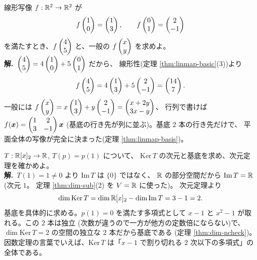 \begin{rei}[例題・基本(基底の行き先から写像を求める)]\label{rei:linmap-fromdata}
線形写像 $f : \mathbb{R}^2 \to \mathbb{R}^2$ が
\[
f\begin{pmatrix}1 \\ 0\end{pmatrix} = \begin{pmatrix}1 \\ 3\end{pmatrix}, \qquad f\begin{pmatrix}0 \\ 1\end{pmatrix} = \begin{pmatrix}2 \\ -1\end{pmatrix}
\]
を満たすとき、$f\begin{pmatrix}4 \\ 5\end{pmatrix}$ と、一般の $f\begin{pmatrix}x \\ y\end{pmatrix}$ を求めよ。\\
\textbf{解.}\ $\begin{pmatrix}4 \\ 5\end{pmatrix} = 4\begin{pmatrix}1 \\ 0\end{pmatrix} + 5\begin{pmatrix}0 \\ 1\end{pmatrix}$ だから、
線形性(定理 \ref{thm:linmap-basic}(3))より
\[
f\begin{pmatrix}4 \\ 5\end{pmatrix} = 4\begin{pmatrix}1 \\ 3\end{pmatrix} + 5\begin{pmatrix}2 \\ -1\end{pmatrix} = \begin{pmatrix}14 \\ 7\end{pmatrix}.
\]
一般には
$f\begin{pmatrix}x \\ y\end{pmatrix} = x\begin{pmatrix}1 \\ 3\end{pmatrix} + y\begin{pmatrix}2 \\ -1\end{pmatrix} = \begin{pmatrix}x + 2y \\ 3x - y\end{pmatrix}$、
行列で書けば $f(\bm{x}) = \begin{pmatrix}1 & 2 \\ 3 & -1\end{pmatrix}\bm{x}$
(基底の行き先が列に並ぶ)。基底 $2$ 本の行き先だけで、
平面全体の写像が完全に決まった(定理 \ref{thm:linmap-basis})。
\end{rei}

\begin{rei}[例題・標準(評価写像の核と像)]\label{rei:linmap-eval}
$T : \mathbb{R}[x]_2 \to \mathbb{R}$, $T(p) = p(1)$ について、
$\mathrm{Ker}\,T$ の次元と基底を求め、次元定理を確かめよ。\\
\textbf{解.}\ $T(1) = 1 \neq 0$ より $\mathrm{Im}\,T$ は $\{0\}$ ではなく、
$\mathbb{R}$ の部分空間だから $\mathrm{Im}\,T = \mathbb{R}$(次元 $1$。
定理 \ref{thm:dim-sub}(2) を $V = \mathbb{R}$ に使った)。
次元定理より
\[
\dim \mathrm{Ker}\,T = \dim \mathbb{R}[x]_2 - \dim \mathrm{Im}\,T = 3 - 1 = 2.
\]
基底を具体的に求める。$p(1) = 0$ を満たす多項式として
$x - 1$ と $x^2 - 1$ が取れる。この $2$ 本は独立
(次数が違うので一方が他方の定数倍にならない)で、
$\dim \mathrm{Ker}\,T = 2$ の空間の独立な $2$ 本だから基底である
(定理 \ref{thm:dim-ncheck})。
因数定理の言葉でいえば、$\mathrm{Ker}\,T$ は「$x - 1$ で割り切れる
$2$ 次以下の多項式」の全体である。
\end{rei}

